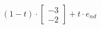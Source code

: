 \documentclass[preview]{standalone}
\begin{document}
\begin{align*}
(1- t ) \cdot \begin{bmatrix} -3 \\ -2 \end{bmatrix} + t \cdot e_{nd}
\end{align*}
\end{document}
